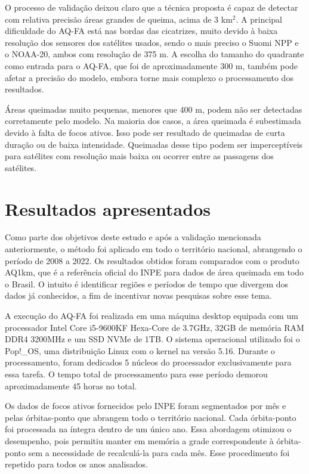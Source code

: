 \documentclass[cic,tc]{iiufrgs}
\begin{document}
O processo de validação deixou claro que a técnica proposta é capaz de detectar com relativa precisão áreas grandes de queima, acima de 3 km$^2$. A principal dificuldade do AQ-FA está nas bordas das cicatrizes, muito devido à baixa resolução dos sensores dos satélites usados, sendo o mais preciso o Suomi NPP e o NOAA-20, ambos com resolução de 375 m. A escolha do tamanho do quadrante como entrada para o AQ-FA, que foi de aproximadamente 300 m, também pode afetar a precisão do modelo, embora torne mais complexo o processamento dos resultados.

Áreas queimadas muito pequenas, menores que 400 m, podem não ser detectadas corretamente pelo modelo. Na maioria dos casos, a área queimada é subestimada devido à falta de focos ativos. Isso pode ser resultado de queimadas de curta duração ou de baixa intensidade. Queimadas desse tipo podem ser imperceptíveis para satélites com resolução mais baixa ou ocorrer entre as passagens dos satélites.

\section{Resultados apresentados}

Como parte dos objetivos deste estudo e após a validação mencionada anteriormente, o método foi aplicado em todo o território nacional, abrangendo o período de 2008 a 2022. Os resultados obtidos foram comparados com o produto AQ1km, que é a referência oficial do INPE para dados de área queimada em todo o Brasil. O intuito é identificar regiões e períodos de tempo que divergem dos dados já conhecidos, a fim de incentivar novas pesquisas sobre esse tema.

A execução do AQ-FA foi realizada em uma máquina desktop equipada com um processador Intel Core i5-9600KF Hexa-Core de 3.7GHz, 32GB de memória RAM DDR4 3200MHz e um SSD NVMe de 1TB. O sistema operacional utilizado foi o Pop!\_OS, uma distribuição Linux com o kernel na versão 5.16. Durante o processamento, foram dedicados 5 núcleos do processador exclusivamente para essa tarefa. O tempo total de processamento para esse período demorou aproximadamente 45 horas no total.

Os dados de focos ativos fornecidos pelo INPE foram segmentados por mês e pelas órbitas-ponto que abrangem todo o território nacional. Cada órbita-ponto foi processada na íntegra dentro de um único ano. Essa abordagem otimizou o desempenho, pois permitiu manter em memória a grade correspondente à órbita-ponto sem a necessidade de recalculá-la para cada mês. Esse procedimento foi repetido para todos os anos analisados.
\end{document}
